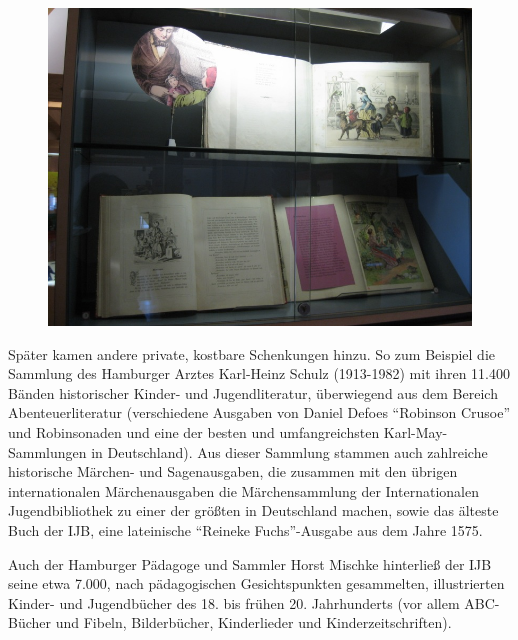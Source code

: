 \documentclass[a4paper,
fontsize=11pt,
oneside,
numbers=noperiodatend,
parskip=half-,
bibliography=totoc,
final
]{scrartcl}
\begin{document}
\begin{figure}[htbp]
\centering
\includegraphics{img/bild16.jpg}
\end{figure}

Später kamen andere private, kostbare Schenkungen hinzu. So zum Beispiel
die Sammlung des Hamburger Arztes Karl-Heinz Schulz (1913-1982) mit
ihren 11.400 Bänden historischer Kinder- und Jugendliteratur,
überwiegend aus dem Bereich Abenteuerliteratur (verschiedene Ausgaben
von Daniel Defoes \enquote{Robinson Crusoe} und Robinsonaden und eine
der besten und umfangreichsten Karl-May-Sammlungen in Deutschland). Aus
dieser Sammlung stammen auch zahlreiche historische Märchen- und
Sagenausgaben, die zusammen mit den übrigen internationalen
Märchenausgaben die Märchensammlung der Internationalen Jugendbibliothek
zu einer der größten in Deutschland machen, sowie das älteste Buch der
IJB, eine lateinische \enquote{Reineke Fuchs}-Ausgabe aus dem Jahre
1575.~

Auch der Hamburger Pädagoge und Sammler Horst Mischke hinterließ der IJB
seine etwa 7.000, nach pädagogischen Gesichtspunkten gesammelten,
illustrierten Kinder- und Jugendbücher des 18. bis frühen 20.
Jahrhunderts (vor allem ABC-Bücher und Fibeln, Bilderbücher,
Kinderlieder und Kinderzeitschriften).~
\end{document}
